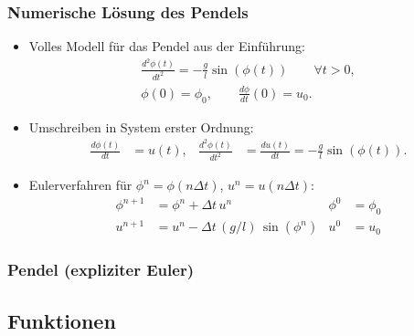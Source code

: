 \begin{frame}[fragile]
\frametitle{Numerische Lösung des Pendels}
\begin{itemize}
\item Volles Modell für das Pendel aus der Einführung:
  \begin{gather*}
    \frac{d^2\phi(t)}{d t^2} = - \frac{g}{l} \sin(\phi(t)) \qquad \forall t>0,\\
    \phi(0) = \phi_0, \qquad \frac{d \phi}{d t}(0) = u_0.
  \end{gather*}
\item Umschreiben in System erster Ordnung:
  \begin{align*}
    \frac{d\phi(t)}{d t} &= u(t), & \frac{d^2\phi(t)}{d t^2} &=
    \frac{d u(t)}{d t} = - \frac{g}{l} \sin(\phi(t)).
  \end{align*}
\item Eulerverfahren für $\phi^n = \phi(n\Delta t)$, $u^n = u(n\Delta t)$:
  \begin{align*}
    \phi^{n+1} &= \phi^n + \Delta t \, u^n & \phi^0 &= \phi_0\\
    u^{n+1} &= u^n -\Delta t \, (g/l) \, \sin(\phi^n) & u^0 &= u_0
  \end{align*}
\end{itemize}
\end{frame}

\begin{frame}[fragile]
\frametitle{Pendel (expliziter Euler)}

\end{frame}

\subsection{Funktionen}

